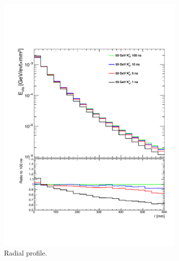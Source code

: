 \begin{figure}[t]
  \centering
  \begin{subfigure}[t]{0.45\textwidth}
    \centering
    \includegraphics[width=1\linewidth]{chap6/fig_TimingILD/NoSmearing/RadialProfileOverlay_noSmearing}
    \caption{Radial profile.} \label{fig:RadialProfNoSmearing}
  \end{subfigure}
  \hfill
  \begin{subfigure}[t]{0.45\textwidth}
    \centering

\end{subfigure}
\end{figure}
